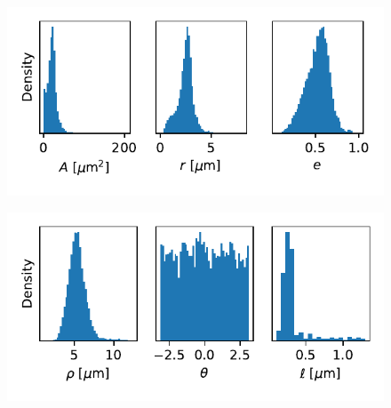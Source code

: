 \documentclass[10pt,conference,compsocconf,a4paper]{IEEEtran}
\begin{document}
	\begin{figure}
		\centering
		\includegraphics[width=\linewidth]{figures/hist_x.pdf}
		\label{fig:hist_x}
	\end{figure}

	\begin{figure}
		\centering
		\includegraphics[width=\linewidth]{figures/hist_e.pdf}
		\label{fig:hist_e}
	\end{figure}
\end{document}
